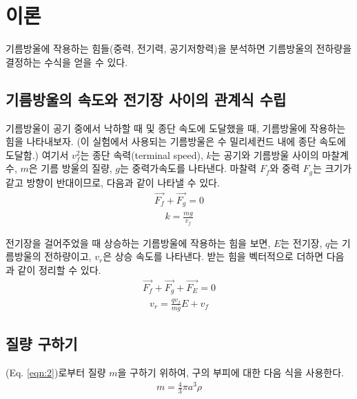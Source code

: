 \documentclass[a4paper, 10pt, nanum]{CSUniSchoolLabReport}
\begin{document}

\section{이론}

	기름방울에 작용하는 힘들(중력, 전기력, 공기저항력)을 분석하면 기름방울의 전하량을 결정하는 수식을 얻을 수 있다.

\subsection{기름방울의 속도와 전기장 사이의 관계식 수립}

	기름방울이 공기 중에서 낙하할 때 및 종단 속도에 도달했을 때, 기름방울에 작용하는 힘을 나타내보자. (이 실험에서 사용되는 기름방울은 수 밀리세컨드 내에 종단 속도에 도달함.) 여기서 $v^2_f$는 종단 속력(terminal speed), $k$는 공기와 기름방울 사이의 마찰계수, $m$은 기름 방울의 질량, $g$는 중력가속도를 나타낸다. 마찰력 $F_f$와 중력 $F_g$는 크기가 같고 방향이 반대이므로, 다음과 같이 나타낼 수 있다.
	\begin{align*}
		\vec{F_f} + \vec{F_g} = 0
	\end{align*}
	\begin{align}
		\label{eqn:1}
		k = \frac{mg}{v_f}
	\end{align}

	전기장을 걸어주었을 때 상승하는 기름방울에 작용하는 힘을 보면, $E$는 전기장, $q$는 기름방울의 전하량이고, $v_r$은 상승 속도를 나타낸다. 받는 힘을 벡터적으로 더하면 다음과 같이 정리할 수 있다.
	\begin{align*}
		\vec{F_f} + \vec{F_g} + \vec{F_E} = 0
	\end{align*}
	\begin{align}
		\label{eqn:2}
		v_r = \frac{qv_f}{mg} E + v_f
	\end{align}

\subsection{질량 구하기}

	(Eq. \ref{eqn:2})로부터 질량 $m$을 구하기 위하여, 구의 부피에 대한 다음 식을 사용한다.
	\begin{align}
		\label{eqn:3}
		m = \frac{4}{3} \pi a^3 \rho
	\end{align}
\end{document}
